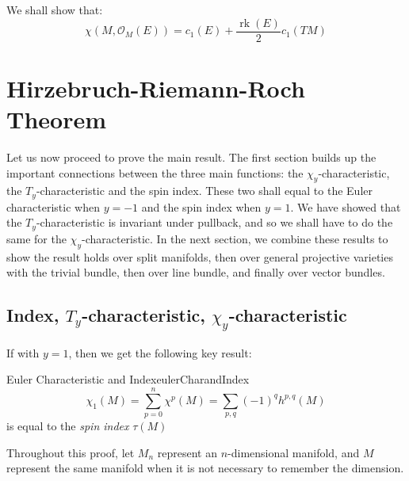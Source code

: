 \documentclass{ut-thesis}
\newcommand{\CO}{{\mathcal{O}}}
\newcommand{\rk}{{\operatorname{rk}}}
\begin{document}
We shall show that:
\[
    \chi(M, \CO_M(E)) = c_1(E) + \frac{\rk(E)}{2}c_1(TM)
\]

\section{Hirzebruch-Riemann-Roch Theorem}\label{sec:HRR}

Let us now proceed to prove the main result. The first section builds up the important connections between the
three main functions: the $\chi_y$-characteristic, the $T_y$-characteristic and the spin index. These two
shall equal to the Euler characteristic when $y=-1$ and the spin index when $y=1$. We have showed that the
$T_y$-characteristic is invariant under pullback, and so we shall have to do the same for the
$\chi_y$-characteristic. In the next section, we combine these results to show the result holds over split
manifolds, then over general projective varieties with the trivial bundle, then over line bundle, and finally
over vector bundles.

\subsection{Index, $T_y$-characteristic, $\chi_y$-characteristic}

If with $y = 1$, then we get the following key result:
\begin{thm}{Euler Characteristic and Index}{eulerCharandIndex}
  \[
  \chi_1(M) = \sum_{p=0}^n \chi^p(M) = \sum_{p,q}(-1)^qh^{p,q}(M)
\]
is equal to the \emph{spin index} $\tau(M)$%
\end{thm}

Throughout this proof, let $M_n$ represent an $n$-dimensional manifold, and $M$ represent the same manifold
when it is not necessary to remember the dimension.
\end{document}

